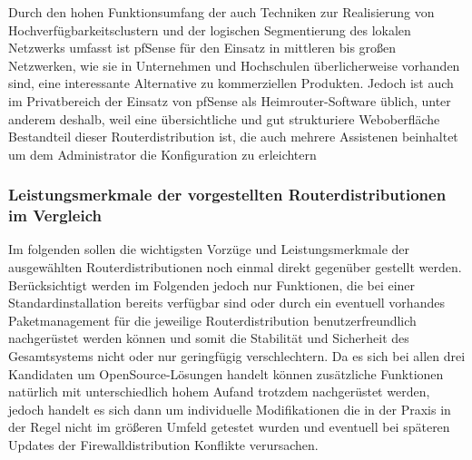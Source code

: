 \documentclass[a4paper,12pt]{scrartcl}
\begin{document}
Durch den hohen Funktionsumfang der auch Techniken zur Realisierung von
Hochverf\"ugbarkeitsclustern und der logischen Segmentierung des lokalen Netzwerks
umfasst ist pfSense f\"ur den Einsatz in mittleren bis gro\ss{}en Netzwerken,
wie sie in Unternehmen und Hochschulen \"uberlicherweise vorhanden sind, eine
interessante Alternative zu kommerziellen Produkten. Jedoch ist auch im
Privatbereich der Einsatz von pfSense als Heimrouter-Software \"ublich,
unter anderem deshalb, weil eine \"ubersichtliche und gut strukturiere Weboberfl\"ache
Bestandteil dieser Routerdistribution ist, die auch mehrere Assistenen beinhaltet
um dem Administrator die Konfiguration zu erleichtern

\subsubsection{Leistungsmerkmale der vorgestellten Routerdistributionen im
Vergleich}
Im folgenden sollen die wichtigsten Vorz\"uge und Leistungsmerkmale der
ausgew\"ahlten Routerdistributionen noch einmal direkt gegen\"uber gestellt
werden.\\

Ber\"ucksichtigt werden im Folgenden jedoch nur Funktionen, die bei einer
Standardinstallation bereits verf\"ugbar sind oder durch ein eventuell
vorhandes Paketmanagement f\"ur die jeweilige Routerdistribution
benutzerfreundlich nachger\"ustet werden k\"onnen und somit die Stabilit\"at
und Sicherheit des Gesamtsystems nicht oder nur geringf\"ugig verschlechtern.
Da es sich bei allen drei Kandidaten um OpenSource-L\"osungen handelt k\"onnen
zus\"atzliche Funktionen nat\"urlich mit unterschiedlich hohem Aufand trotzdem
nachger\"ustet werden, jedoch handelt es sich dann um individuelle
Modifikationen die in der Praxis in der Regel nicht im gr\"o\ss{}eren Umfeld
getestet wurden und eventuell bei sp\"ateren Updates der Firewalldistribution
Konflikte verursachen.\\
\end{document}
